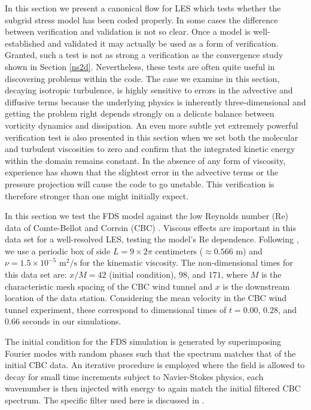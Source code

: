 \documentclass[11pt]{book}
\begin{document}
In this section we present a canonical flow for LES which tests whether the subgrid stress model has been coded properly.
In some cases the difference between verification and validation is not so clear.  Once a model is well-established and validated it may actually be used as a form of verification.  Granted, such a test is not as strong a verification as the convergence study shown in Section \ref{ns2d}.  Nevertheless, these tests are often quite useful in discovering problems within the code.  The case we examine in this section, decaying isotropic turbulence, is highly sensitive to errors in the advective and diffusive terms because the underlying physics is inherently three-dimensional and getting the problem right depends strongly on a delicate balance between vorticity dynamics and dissipation.  An even more subtle yet extremely powerful verification test is also presented in this section when we set both the molecular and turbulent viscosities to zero and confirm that the integrated kinetic energy within the domain remains constant.   In the absence of any form of viscosity, experience has shown that the slightest error in the advective terms or the pressure projection will cause the code to go unstable.  This verification is therefore stronger than one might initially expect.

In this section we test the FDS model against the low Reynolds number (Re) data of Comte-Bellot and Corrsin (CBC) \cite{CBC}. Viscous effects are important in this data set for a well-resolved LES, testing the model's Re dependence.  Following \cite{SdBK}, we use a periodic box of side $L = 9 \times 2\pi$ centimeters ($\approx 0.566$ m) and $\nu = 1.5 \times 10^{-5}$ $\mbox{m}^2/\mbox{s}$ for the kinematic viscosity. The non-dimensional times for this data set are: $x/M = 42$ (initial condition), $98$, and $171$, where $M$ is the characteristic mesh spacing of the CBC wind tunnel and $x$ is the downstream location of the data station. Considering the mean velocity in the CBC wind tunnel experiment, these correspond to dimensional times of $t = 0.00$, $0.28$, and $0.66$ seconds in our simulations.

The initial condition for the FDS simulation is generated by superimposing Fourier modes with random phases such that the spectrum matches that of the initial CBC data.  An iterative procedure is employed where the field is allowed to decay for small time increments subject to Navier-Stokes physics, each wavenumber is then injected with energy to again match the initial filtered CBC spectrum.  The specific filter used here is discussed in \cite{McDermott:2005b}.
\end{document}
